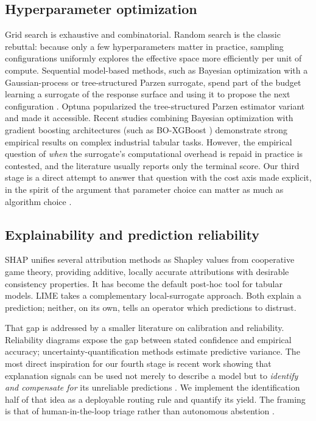 \documentclass{ieeeaccess}
\begin{document}
\subsection{Hyperparameter optimization}
Grid search is exhaustive and combinatorial. Random search \cite{bergstra2012random} is the classic rebuttal: because only a few hyperparameters matter in practice, sampling configurations uniformly explores the effective space more efficiently per unit of compute. Sequential model-based methods, such as Bayesian optimization with a Gaussian-process or tree-structured Parzen surrogate, spend part of the budget learning a surrogate of the response surface and using it to propose the next configuration \cite{snoek2012practical}. Optuna \cite{akiba2019optuna} popularized the tree-structured Parzen estimator variant and made it accessible. Recent studies combining Bayesian optimization with gradient boosting architectures (such as BO-XGBoost \cite{boxgboost2026}) demonstrate strong empirical results on complex industrial tabular tasks. However, the empirical question of \emph{when} the surrogate's computational overhead is repaid in practice is contested, and the literature usually reports only the terminal score. Our third stage is a direct attempt to answer that question with the cost axis made explicit, in the spirit of the argument that parameter choice can matter as much as algorithm choice \cite{spectral2025}.

\subsection{Explainability and prediction reliability}
SHAP \cite{lundberg2017unified} unifies several attribution methods as Shapley values from cooperative game theory, providing additive, locally accurate attributions with desirable consistency properties. It has become the default post-hoc tool for tabular models. LIME \cite{ribeiro2016lime} takes a complementary local-surrogate approach. Both explain a prediction; neither, on its own, tells an operator which predictions to distrust.

That gap is addressed by a smaller literature on calibration and reliability. Reliability diagrams \cite{niculescu2005predicting,guo2017calibration} expose the gap between stated confidence and empirical accuracy; uncertainty-quantification methods \cite{gal2016dropout} estimate predictive variance. The most direct inspiration for our fourth stage is recent work showing that explanation signals can be used not merely to describe a model but to \emph{identify and compensate for} its unreliable predictions \cite{shapcomp2025}. We implement the identification half of that idea as a deployable routing rule and quantify its yield. The framing is that of human-in-the-loop triage rather than autonomous abstention \cite{settles2009active}.
\end{document}
